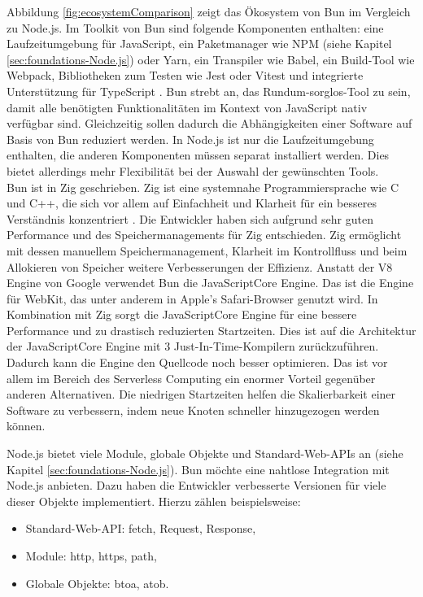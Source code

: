 \noindent
Abbildung \ref{fig:ecosystemComparison} zeigt das Ökosystem von Bun im Vergleich zu Node.js. Im Toolkit von Bun sind folgende Komponenten enthalten: eine Laufzeitumgebung für JavaScript, ein Paketmanager wie NPM (siehe Kapitel \ref{sec:foundations-Node.js}) oder Yarn, ein Transpiler wie Babel, ein Build-Tool wie Webpack, Bibliotheken zum Testen wie Jest oder Vitest und integrierte Unterstützung für TypeScript \cite{Sumner.2023b}. Bun strebt an, das Rundum-sorglos-Tool zu sein, damit alle benötigten Funktionalitäten im Kontext von JavaScript nativ verfügbar sind. Gleichzeitig sollen dadurch die Abhängigkeiten einer Software auf Basis von Bun reduziert werden. In Node.js ist nur die Laufzeitumgebung enthalten, die anderen Komponenten müssen separat installiert werden. Dies bietet allerdings mehr Flexibilität bei der Auswahl der gewünschten Tools.\cite{Springer.2022, Bun.}\\

\noindent
Bun ist in Zig geschrieben. Zig ist eine systemnahe Programmiersprache wie C und C++, die sich vor allem auf Einfachheit und Klarheit für ein besseres Verständnis konzentriert \cite{ZigSoftwareFoundation.o.J.}. Die Entwickler haben sich aufgrund sehr guten Performance und des Speichermanagements für Zig entschieden. Zig ermöglicht mit dessen manuellem Speichermanagement, Klarheit im Kontrollfluss und beim Allokieren von Speicher weitere Verbesserungen der Effizienz. Anstatt der V8 Engine von Google verwendet Bun die JavaScriptCore Engine. Das ist die Engine für WebKit, das unter anderem in Apple's Safari-Browser genutzt wird. In Kombination mit Zig sorgt die JavaScriptCore Engine für eine bessere Performance und zu drastisch reduzierten Startzeiten. Dies ist auf die Architektur der JavaScriptCore Engine mit 3 Just-In-Time-Kompilern zurückzuführen. Dadurch kann die Engine den Quellcode noch besser optimieren. Das ist vor allem im Bereich des Serverless Computing ein enormer Vorteil gegenüber anderen Alternativen. Die niedrigen Startzeiten helfen die Skalierbarkeit einer Software zu verbessern, indem neue Knoten schneller hinzugezogen werden können.\cite{Bun., Apple.o.J., Apple.o.J.b, Silva.2020}  

\noindent
Node.js bietet viele Module, globale Objekte und Standard-Web-APIs an (siehe Kapitel \ref{sec:foundations-Node.js}). Bun möchte eine nahtlose Integration mit Node.js anbieten. Dazu haben die Entwickler verbesserte Versionen für viele dieser Objekte implementiert. Hierzu zählen beispielsweise:
\begin{itemize}
	\item Standard-Web-API: fetch, Request, Response,
	\item Module: http, https, path,
	\item Globale Objekte: btoa, atob.\cite{Bun.} 
\end{itemize} 

